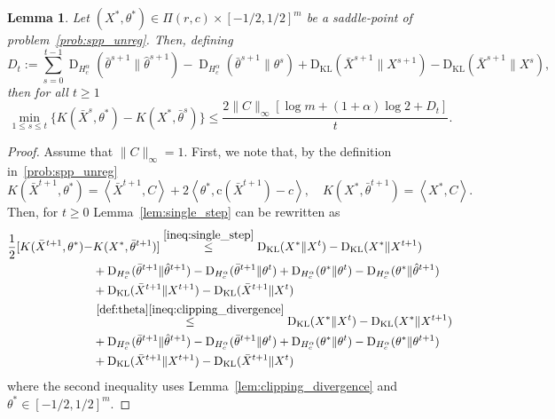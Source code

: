 \documentclass[10pt]{article}
\newcommand{\DHa}{\D_{H_c^\alpha}}
\newcommand{\inner}[2]{\left\langle #1,#2\right\rangle}
\newcommand{\coup}{\Pi}
\newcommand{\D}{\operatorname{D}}
\theoremstyle{plain}
\newtheorem{lemma}[theorem]{Lemma}
\theoremstyle{definition}
\theoremstyle{remark}
\newcommand{\KL}{\mathrm{D}_\mathrm{KL}}
\newcommand{\col}{\bm{\mathrm{c}}}
\begin{document}
\begin{lemma}\label{lem:summability}
    Let $(X^*,\theta^*)\in\coup(r,c)\times[-1/2,1/2]^m$ be a saddle-point of problem~\eqref{prob:spp_unreg}. Then, defining
    \begin{equation}\label{def:sum_condition_2}
    D_t:=\sum_{s=0}^{t-1}\DHa(\bar\theta^{s+1}\|\hat\theta^{s+1})- \DHa(\bar\theta^{s+1}\|\theta^{s})+\KL(\bar X^{s+1}\|X^{s+1})- \KL(\bar X^{s+1}\|X^{s}),\end{equation}
    then for all $t\geq 1$
    \begin{equation}\label{ineq:spp_midpoint_conv_appdx}
        \min_{1\leq s\leq t}\{K(\bar X^s,\theta^*)-K(X^*,\bar\theta^s)\}\leq\frac{2\|C\|_\infty[\log m+(1+\alpha)\log 2+D_t]}{t}.
    \end{equation}
\end{lemma}
\begin{proof}        
        Assume that $\|C\|_\infty=1$. First, we note that, by the definition in~\eqref{prob:spp_unreg}
        \[K(\bar X^{t+1},\theta^*)=\inner{\bar X^{t+1}}{C}+2\inner{\theta^*}{\col(\bar X^{t+1})-c},\quad K(X^{*},\bar\theta^{t+1})=\inner{X^*}{C}.\]
        Then, for $t\geq 0$ Lemma~\ref{lem:single_step} can be rewritten as 
        \begin{align*}
        \frac{1}{2}[K(\bar X^{t+1},\theta^*)-&K(X^{*},\bar\theta^{t+1})] \stackrel{\eqref{ineq:single_step}}\leq \KL(X^*\|X^t)-\KL(X^*\|X^{t+1})\\
        &+\DHa(\bar\theta^{t+1}\|\hat\theta^{t+1})- \DHa(\bar\theta^{t+1}\|\theta^{t})+\DHa(\theta^*\|\theta^{t})-\DHa(\theta^*\|\hat\theta^{t+1})\\
        &+\KL(\bar X^{t+1}\|X^{t+1})- \KL(\bar X^{t+1}\|X^{t})\\
        &\stackrel{\eqref{def:theta}\eqref{ineq:clipping_divergence}}\leq \KL(X^*\|X^t)-\KL(X^*\|X^{t+1})\\
        &+\DHa(\bar\theta^{t+1}\|\hat\theta^{t+1})- \DHa(\bar\theta^{t+1}\|\theta^{t})+\DHa(\theta^*\|\theta^{t})-\DHa(\theta^*\|\theta^{t+1})\\
        &+\KL(\bar X^{t+1}\|X^{t+1})- \KL(\bar X^{t+1}\|X^{t})
    \end{align*}
    where the second inequality uses Lemma~\ref{lem:clipping_divergence} and $\theta^{*}\in[-1/2,1/2]^m$.
    

\end{proof}
\end{document}
